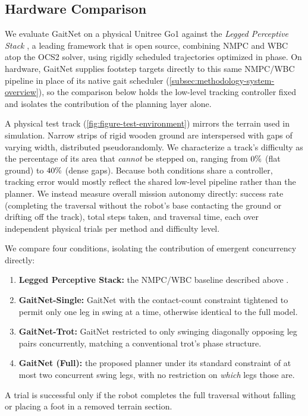 
\subsection{Hardware Comparison}
\label{subsec:results-hardware-comparison}

We evaluate GaitNet on a physical Unitree Go1 against the
\textit{Legged Perceptive Stack} \cite{leggedperceptive}, a
leading framework that is open source, combining NMPC and WBC atop
the OCS2 solver, using rigidly scheduled trajectories optimized in
phase. On hardware, GaitNet supplies footstep targets directly
to this same NMPC/WBC pipeline in place of its native gait scheduler
(\autoref{subsec:methodology-system-overview}), so the comparison
below holds the low-level tracking controller fixed and isolates the
contribution of the planning layer alone.

A physical test track (\autoref{fig:figure-test-environment}) mirrors
the terrain used in simulation. Narrow strips of rigid wooden ground
are interspersed with gaps of varying width, distributed
pseudorandomly. We characterize a track's difficulty as the
percentage of its area that \emph{cannot} be stepped on, ranging from
$0\%$ (flat ground) to $40\%$ (dense
gaps). Because both conditions share a controller, tracking error
would mostly reflect the shared low-level pipeline rather than the
planner. We instead measure overall mission autonomy directly: success
rate (completing the
traversal without the robot's base contacting the ground or drifting
off the track), total steps taken, and traversal time, each over
\corlHwTrialsPerCell{} independent physical trials per method and
difficulty level.

We compare four conditions, isolating the contribution of emergent
concurrency directly:
\begin{enumerate}
  \item \textbf{Legged Perceptive Stack:} the NMPC/WBC baseline
    described above \cite{leggedperceptive}.
  \item \textbf{GaitNet-Single:} GaitNet with the contact-count
    constraint tightened to permit only one leg in swing at a time,
    otherwise identical to the full model.
  \item \textbf{GaitNet-Trot:} GaitNet restricted to only swinging
    diagonally opposing leg pairs concurrently, matching a
    conventional trot's phase structure.
  \item \textbf{GaitNet (Full):} the proposed planner under its
    standard constraint of at most two concurrent swing legs, with no
    restriction on \emph{which} legs those are.
\end{enumerate}
A trial is successful only if the robot completes the full traversal
without falling or placing a foot in a removed terrain section.

